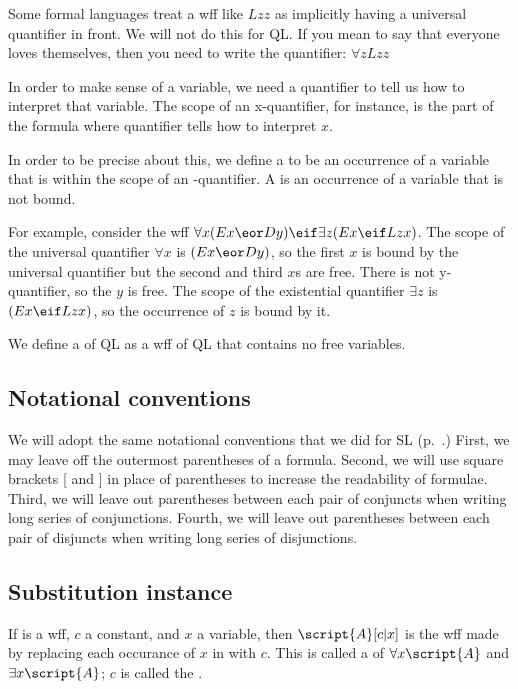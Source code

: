 Some formal languages treat a wff like $Lzz$ as implicitly having a universal quantifier in front. We will not do this for QL. If you mean to say that everyone loves themselves, then you need to write the quantifier: $\forall zLzz$

In order to make sense of a variable, we need a quantifier to tell us how to interpret that variable. The scope of an x-quantifier, for instance, is the part of the formula where quantifier tells how to interpret $x$.

In order to be precise about this, we define a  to be an occurrence of a variable  that is within the scope of an -quantifier. A  is an occurrence of a variable that is not bound.

For example, consider the wff $\forall x(Ex \eor Dy) \eif \exists z(Ex \eif Lzx)$. The scope of the universal quantifier $\forall x$ is $(Ex \eor Dy)$, so the first $x$ is bound by the universal quantifier but the second and third $x$s are free. There is not y-quantifier, so the $y$ is free. The scope of the existential quantifier $\exists z$ is $(Ex \eif Lzx)$, so the occurrence of $z$ is bound by it.

We define a  of QL as a wff of QL that contains no free variables.



\subsection{Notational conventions}
We will adopt the same notational conventions that we did for SL (p.~\pageref{SLconventions}.) First, we may leave off the outermost parentheses of a formula. Second, we will use square brackets [ and ] in place of parentheses to increase the readability of formulae. Third, we will leave out parentheses between each pair of conjuncts when writing long series of conjunctions. Fourth, we will leave out parentheses between each pair of disjuncts when writing long series of disjunctions.

\subsection{Substitution instance}

If  is a wff, $c$ a constant, and $x$ a variable, then $\script{A}[c|x]$ is the wff made by replacing each occurance of $x$ in  with $c$. This is called a  of $\forall x\script{A}$ and $\exists x\script{A}$; $c$ is called the .

